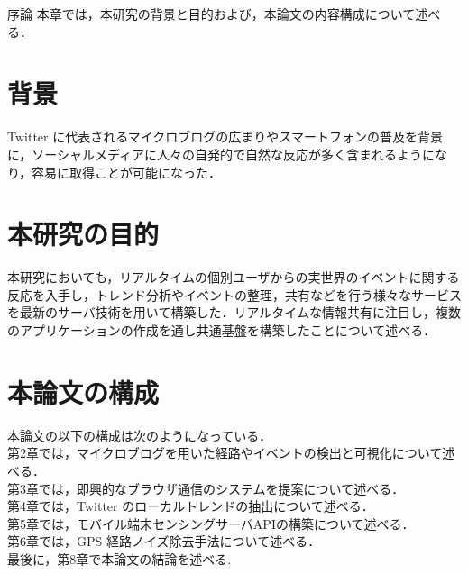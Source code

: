 \chapterhead
{序論}
{本章では，本研究の背景と目的および，本論文の内容構成について述べる．}

\section{背景}
Twitter に代表されるマイクロブログの広まりやスマートフォンの普及を背景に，ソーシャルメディアに人々の自発的で自然な反応が多く含まれるようになり，容易に取得ことが可能になった．

\section{本研究の目的}
本研究においても，リアルタイムの個別ユーザからの実世界のイベントに関する反応を入手し，トレンド分析やイベントの整理，共有などを行う様々なサービスを最新のサーバ技術を用いて構築した．リアルタイムな情報共有に注目し，複数のアプリケーションの作成を通し共通基盤を構築したことについて述べる．

\section{本論文の構成}
本論文の以下の構成は次のようになっている．\\
第2章では，マイクロブログを用いた経路やイベントの検出と可視化について述べる．\\
第3章では，即興的なブラウザ通信のシステムを提案について述べる．\\
第4章では，Twitter のローカルトレンドの抽出について述べる．\\
第5章では，モバイル端末センシングサーバAPIの構築について述べる．\\
第6章では，GPS 経路ノイズ除去手法について述べる．\\
最後に，第8章で本論文の結論を述べる.\cite{weko_200941_1} \\

\newpage
